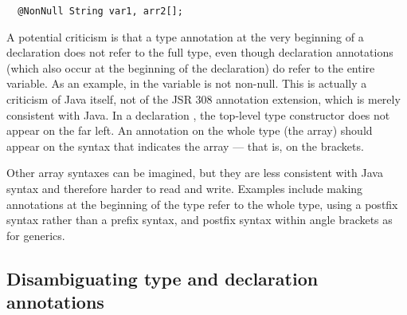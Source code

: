 \documentclass[10pt]{article}
\begin{document}
\begin{Verbatim}
  @NonNull String var1, arr2[];
\end{Verbatim}

% 




A potential criticism is that a type annotation at the very beginning of a
declaration does not refer to the full type, even though declaration
annotations (which also occur at the beginning of
the declaration) do refer to the entire variable.  As an example, in
 the variable  is not non-null.
This is actually a criticism of Java itself, not of the JSR 308
annotation extension, which is merely consistent with Java.  In a
declaration , the top-level type constructor does not
appear on the far left.  An annotation on the whole type (the array) should
appear on the syntax that indicates the array --- that is, on the brackets.


Other array syntaxes can be imagined, but they are less consistent with
Java syntax and therefore harder to read and write.
Examples include
making annotations at the beginning of the type refer to the whole type,
using a postfix syntax rather than a prefix syntax, and postfix syntax
within angle brackets as for generics.



\subsection{Disambiguating type and declaration annotations\label{disambiguating}}
\end{document}
